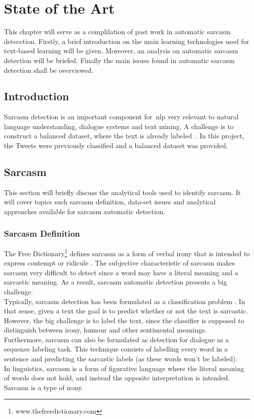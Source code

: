 \chapter{State of the Art}
\label{chap:enabling_technologies}
This chapter will serve as a complilation of past work in automatic sarcasm detecction.
Firstly, a brief introduction on the main learning technologies used for text-based learning will be given. Moreover, an analysis on automatic sarcasm detection will be briefed. Finally the main issues found in automatic sarcasm detection shall be overviewed.

\section{Introduction}
Sarcasm detection is an important component for~\ac{nlp} very relevant to natural language understanding, dialogue systems and text mining. A challenge is to construct a balanced dataset, where the text is already labeled~\cite{khodak2017large}. In this project, the Tweets were previously classified and a balanced dataset was provided.
\section{Sarcasm}
This section will briefly discuss the analytical tools used to identify sarcasm. It will cover topics such sarcasm definition, data-set issues and analytical approaches available for sarcasm automatic detection. 
\subsection{Sarcasm Definition~\cite{joshi2017automatic}}
The Free Dictionary\footnote{www.thefreedictionary.com} defines sarcasm as a form of verbal irony that is intended to express contempt or ridicule . The subjective characteristic of sarcasm makes sarcasm very difficult to detect since a word may have a literal meaning and a sarcastic meaning. As a result, sarcasm automatic detection presents a big challenge. \\
Typically, sarcasm detection has been formulated as a classification problem . In that sense, given a text the goal is to predict whether or not the text is sarcastic. However, the big challenge is to label the text, since the classifier is supposed to distinguish between irony,  humour and other sentimental meanings.\\
Furthermore, sarcasm can also be formulated as detection for dialogue as a sequence labeling task. This technique consists of labelling every word in a sentence and predicting the sarcastic labels (as these words won't be labeled).\\
In linguistics, sarcasm is a form of figurative language where the literal meaning of words does not hold, and instead the opposite interpretation is intended. Sarcasm is a type of irony. 

